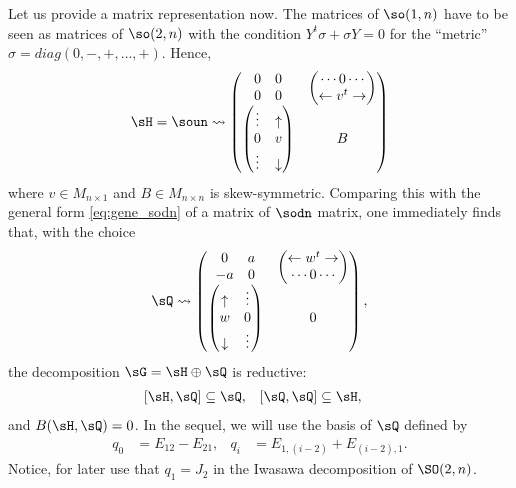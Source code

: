 Let us provide a matrix representation now. The matrices of $\so(1,n)$ have to be seen as matrices of $\so(2,n)$ with the condition $Y^t\sigma+\sigma Y=0$ for the  ``metric''\ $\sigma=diag(0,-,+,\ldots,+)$. Hence,
\begin{equation}		\label{eq:gene_H}
\sH=\soun\leadsto
  \begin{pmatrix}
     \begin{matrix}
       0&0\\
       0&0
     \end{matrix}
                       &  \begin{pmatrix}
		             \cdots 0\cdots\\
			    \leftarrow v^t\rightarrow
                          \end{pmatrix}\\
    \begin{pmatrix}	  
       \vdots & \uparrow\\
         0    & v \\
       \vdots & \downarrow
    \end{pmatrix} &  B
  \end{pmatrix}
\end{equation}
where  $v\in M_{n\times 1}$ and $B\in M_{n\times n}$ is skew-symmetric. Comparing this with the general form \eqref{eq:gene_sodn} of a matrix of $\sodn$ matrix, one immediately finds that, with the choice
\begin{equation}\label{EqGeneRedQ}
\sQ\leadsto
 \begin{pmatrix}
     \begin{matrix}
       0&a\\
       -a&0
     \end{matrix}
                       &  \begin{pmatrix}		             
			  \leftarrow w^t\rightarrow \\
			     \cdots 0\cdots\\
                          \end{pmatrix}\\
    \begin{pmatrix}	  
      \uparrow   & \vdots\\
          w      &  0\\
      \downarrow & \vdots 
    \end{pmatrix} & 0
  \end{pmatrix},
 \end{equation}
the decomposition $\sG=\sH\oplus\sQ$ is reductive:
\begin{align}		\label{EqDefRedHQ}
  [\sH,\sQ]&\subseteq\sQ,
 &[\sQ,\sQ]&\subseteq\sH,
\end{align}
and $B(\sH,\sQ)=0$. In the sequel, we will use the basis of $\sQ$ defined by 
\begin{align}		\label{EqDefBaseqi}
  q_0&=E_{12}-E_{21}, &q_i&=E_{1,(i-2)}+E_{(i-2),1}.
\end{align}
Notice, for later use that $q_1=J_2$ in the Iwasawa decomposition of $\SO(2,n)$.

